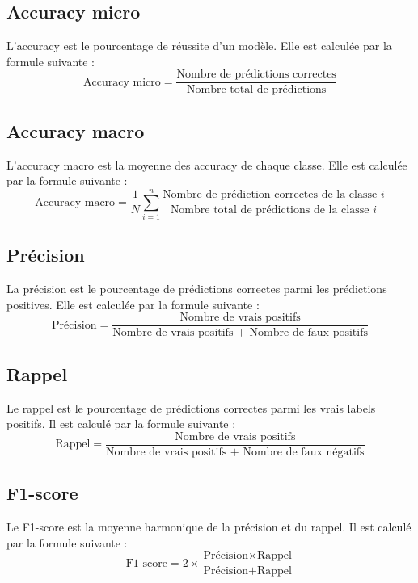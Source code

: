\subsection{Accuracy micro}
L'accuracy est le pourcentage de réussite d'un modèle. Elle est calculée par la formule suivante :
\begin{equation}
    \text{Accuracy micro} = \frac{\text{Nombre de prédictions correctes}}{\text{Nombre total de prédictions}}
\end{equation}

\subsection{Accuracy macro}
L'accuracy macro est la moyenne des accuracy de chaque classe. Elle est calculée par la formule suivante :
\begin{equation}
    \text{Accuracy macro} = \frac{1}{N} \sum_{i=1}^{n} \frac{\text{Nombre de prédiction correctes de la classe } i}{\text{Nombre total de prédictions de la classe } i}{}
\end{equation}

\subsection{Précision}
La précision est le pourcentage de prédictions correctes parmi les prédictions positives. Elle est calculée par la formule suivante :
\begin{equation}
    \text{Précision} = \frac{\text{Nombre de vrais positifs}}{\text{Nombre de vrais positifs + Nombre de faux positifs}}
\end{equation}

\subsection{Rappel}
Le rappel est le pourcentage de prédictions correctes parmi les vrais labels positifs. Il est calculé par la formule suivante :
\begin{equation}
    \text{Rappel} = \frac{\text{Nombre de vrais positifs}}{\text{Nombre de vrais positifs + Nombre de faux négatifs}} 
\end{equation}

\subsection{F1-score}
Le F1-score est la moyenne harmonique de la précision et du rappel. Il est calculé par la formule suivante :
\begin{equation}
    \text{F1-score} = 2 \times \frac{\text{Précision} \times \text{Rappel}}{\text{Précision} + \text{Rappel}}
\end{equation}

